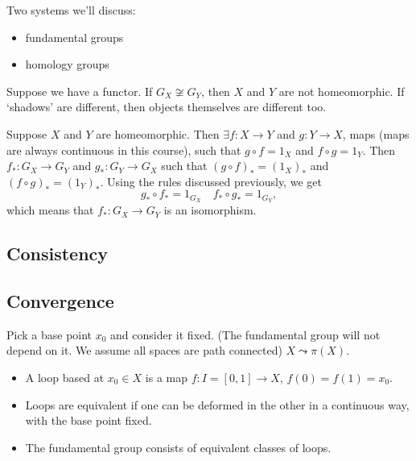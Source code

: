 Two systems we'll discuss:
\begin{itemize}
    \item fundamental groups
    \item homology groups
\end{itemize}


\begin{eg}
    Suppose we have a functor.
    If $G_X \not\cong G_Y$, then  $X$ and  $Y$ are not homeomorphic.
    If `shadows' are different, then objects themselves are different too.
\end{eg}
\begin{explanation}
    Suppose $X$ and $Y$ are homeomorphic.
    Then $\exists f: X \to  Y$ and $g: Y \to  X$, maps (maps are always continuous in this course), such that $g  \circ f = 1_X$ and $f \circ g = 1_Y$.
    Then $f_*: G_X \to G_Y$ and $g_*: G_Y \to  G_X$ such that $(g \circ f)_* = (1_X)_*$ and  $(f \circ g)_* = (1_Y)_*$. Using the rules discussed previously, we get
    \[
    g_*  \circ f_* = 1_{G_X} \quad f_*  \circ  g_* = 1_{G_Y}
    ,\] 
    which means that $f_* : G_X \to  G_Y$ is an isomorphism.
\end{explanation}

\subsection{Consistency}

\subsection{Convergence}
Pick a base point $x_0$ and consider it fixed. (The fundamental group will not depend on it. We assume all spaces are path connected)
$X \leadsto \pi(X)$.
\begin{itemize}
    \item A loop based at $x_0 \in X$ is a map $f: I = [0, 1] \to X$, $f(0) = f(1) = x_0$.
    \item Loops are equivalent if one can be deformed in the other in a continuous way, with the base point fixed.
    \item The fundamental group consists of equivalent classes of loops.
\end{itemize}

